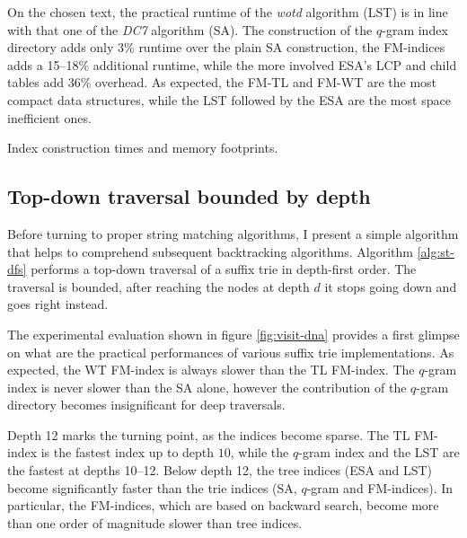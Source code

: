 On the chosen text, the practical runtime of the \emph{wotd} algorithm (LST) is in line with that one of the \emph{DC7} algorithm (SA). The construction of the $q$-gram index directory adds only 3\% runtime over the plain SA construction, the FM-indices adds a 15--18\% additional runtime, while the more involved ESA's LCP and child tables add 36\% overhead.
As expected, the FM-TL and FM-WT are the most compact data structures, while the LST followed by the ESA are the most space inefficient ones.

\begin{table}[t]
\begin{center}
\caption[Index construction times and memory footprints]{Index construction times and memory footprints.}
\sffamily

\label{tab:index:construction}
\end{center}
\end{table}

\subsection{Top-down traversal bounded by depth}
\label{sec:index:algo:traversal}

Before turning to proper string matching algorithms, I present a simple algorithm that helps to comprehend subsequent backtracking algorithms.
Algorithm \ref{alg:st-dfs} performs a top-down traversal of a suffix trie in depth-first order.
The traversal is bounded, \ie after reaching the nodes at depth $d$ it stops going down and goes right instead.

The experimental evaluation shown in figure \ref{fig:visit-dna} provides a first glimpse on what are the practical performances of various suffix trie implementations.
As expected, the WT FM-index is always slower than the TL FM-index.
The $q$-gram index is never slower than the SA alone, however the contribution of the $q$-gram directory becomes insignificant for deep traversals.

Depth 12 marks the turning point, as the indices become sparse.
The TL FM-index is the fastest index up to depth $10$, while the $q$-gram index and the LST are the fastest at depths 10--12.
Below depth 12, the tree indices (ESA and LST) become significantly faster than the trie indices (SA, $q$-gram and FM-indices).
In particular, the FM-indices, which are based on backward search, become more than one order of magnitude slower than tree indices.

